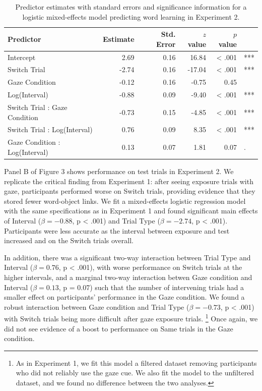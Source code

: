 \documentclass[a4paper,man,floatsintext]{apa6}
\begin{document}
\begin{table}[ht]
\centering
\caption{Predictor estimates with standard errors and significance information for a logistic mixed-effects model predicting word learning in Experiment 2.} 
\label{tab:exp2_reg}
\begin{tabular}{lrrrrl}
 Predictor & Estimate & Std. Error & $z$ value & $p$ value &  \\ 
  \hline
Intercept & 2.69 & 0.16 & 16.84 & < .001 & *** \\ 
  Switch Trial & -2.74 & 0.16 & -17.04 & < .001 & *** \\ 
  Gaze Condition & -0.12 & 0.16 & -0.75 & 0.45 &  \\ 
  Log(Interval) & -0.88 & 0.09 & -9.40 & < .001 & *** \\ 
  Switch Trial : Gaze Condition & -0.73 & 0.15 & -4.85 & < .001 & *** \\ 
  Switch Trial : Log(Interval) & 0.76 & 0.09 & 8.35 & < .001 & *** \\ 
  Gaze Condition : Log(Interval) & 0.13 & 0.07 & 1.81 & 0.07 & . \\ 
   \hline
\end{tabular}
\end{table}

Panel B of Figure 3 shows performance on test trials in Experiment 2. We
replicate the critical finding from Experiment 1: after seeing exposure
trials with gaze, participants performed worse on Switch trials,
providing evidence that they stored fewer word-object links. We fit a
mixed-effects logistic regression model with the same specifications as
in Experiment 1 and found significant main effects of Interval
(\(\beta = -0.88\), p \textless{} .001) and Trial Type
(\(\beta = -2.74\), p \textless{} .001). Participants were less accurate
as the interval between exposure and test increased and on the Switch
trials overall.

In addition, there was a significant two-way interaction between Trial
Type and Interval (\(\beta = 0.76\), p \textless{} .001), with worse
performance on Switch trials at the higher intervals, and a marginal
two-way interaction betwen Gaze condition and Interval
(\(\beta = 0.13\), p = 0.07) such that the number of intervening trials
had a smaller effect on participants' performance in the Gaze condition.
We found a robust interaction between Gaze condition and Trial Type
(\(\beta = -0.73\), p \textless{} .001) with Switch trials being more
difficult after gaze exposure trials.
\footnote{As in Experiment 1, we fit this model a filtered dataset removing participants who did not reliably use the gaze cue. We also fit the model to the unfiltered dataset, and we found no difference between the two analyses.}
Once again, we did not see evidence of a boost to performance on Same
trials in the Gaze condition.
\end{document}
